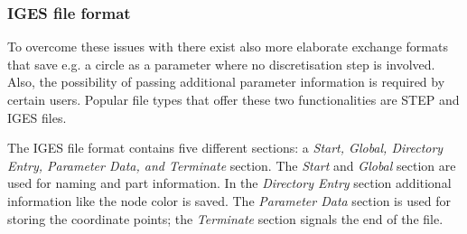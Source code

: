 \subsubsection{IGES file format}
To overcome these issues with there exist also more elaborate exchange formats that save e.g. a circle as a parameter where no discretisation step is involved. Also, the possibility of passing additional parameter information is required by certain users. Popular file types that offer these two functionalities are STEP and IGES files. 

The IGES file format contains five different sections: a \emph{Start, Global, Directory Entry, Parameter Data, and Terminate} section. The \emph{Start} and \emph{Global} section are used for naming and part information. In the \emph{Directory Entry} section additional information like the node color is saved. The \emph{Parameter Data} section is used for storing the coordinate points; the \emph{Terminate} section signals the end of the file. 

